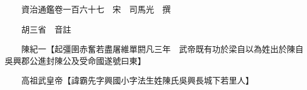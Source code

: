 










 


 
 


 

  
  
  
  
  





  
  
  
  
  
 
  

  

  
  
  



  

 
 

  
   




  

  
  


  　　資治通鑑卷一百六十七　宋　司馬光　撰

　　胡三省　音註

　　陳紀一【起彊圉赤奮若盡屠維單閼凡三年　武帝既有功於梁自以為姓出於陳自吳興郡公進封陳公及受命國遂號曰東】

　　高祖武皇帝【諱霸先字興國小字法生姓陳氏吳興長城下若里人】

